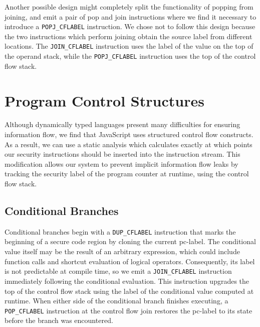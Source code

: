 \documentclass[preprint]{sigplanconf}
\begin{document}
Another possible design might completely split the functionality of popping from joining, and emit a pair of pop and join instructions where we find it necessary to introduce a \texttt{POPJ\_CFLABEL} instruction.
We chose not to follow this design because the two instructions which perform joining obtain the source label from different locations.
The \texttt{JOIN\_CFLABEL} instruction uses the label of the value on the top of the operand stack, while the \texttt{POPJ\_CFLABEL} instruction uses the top of the control flow stack.


\section{Program Control Structures}
\label{sec:program-control-structures}

Although dynamically typed languages present many difficulties for ensuring information flow, we find that JavaScript uses structured control flow constructs.
As a result, we can use a static analysis which calculates exactly at which points our security instructions should be inserted into the instruction stream.
This modification allows our system to prevent implicit information flow leaks by tracking the security label of the program counter at runtime, using the control flow stack.

\subsection{Conditional Branches}
Conditional branches begin with a \texttt{DUP\_CFLABEL} instruction that marks the beginning of a secure code region by cloning the current pc-label.
The conditional value itself may be the result of an arbitrary expression, which could include function calls and shortcut evaluation of logical operators.
Consequently, its label is not predictable at compile time, so we emit a \texttt{JOIN\_CFLABEL} instruction immediately following the conditional evaluation.
This instruction upgrades the top of the control flow stack using the label of the conditional value computed at runtime.
When either side of the conditional branch finishes executing, a \texttt{POP\_CFLABEL} instruction at the control flow join restores the pc-label to its state before the branch was encountered.
\end{document}
